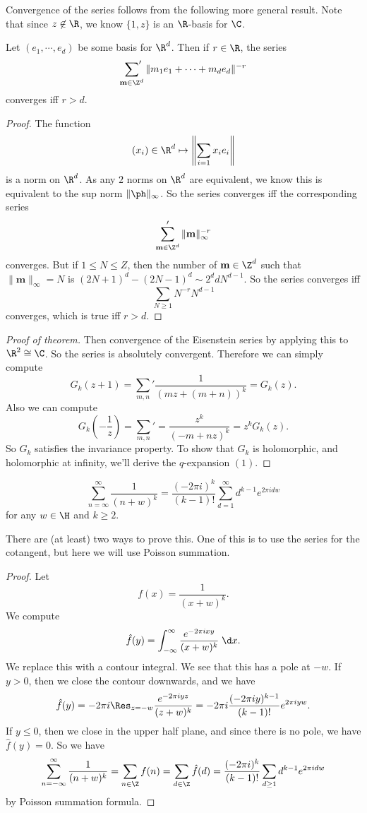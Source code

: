 \documentclass[a4paper]{article}
\begin{document}
Convergence of the series follows from the following more general result. Note that since $z \not \in \R$, we know $\{1, z\}$ is an $\R$-basis for $\C$.
\begin{prop}
  Let $(e_1, \cdots, e_d)$ be some basis for $\R^d$. Then if $r \in \R$, the series
  \[
    \sideset{}{'}\sum_{\mathbf{m} \in \Z^d} \|m_1 e_1 + \cdots + m_d e_d\|^{-r}
  \]
  converges iff $r > d$.
\end{prop}

\begin{proof}
  The function
  \[
    (x_i) \in \R^d \mapsto \left\|\sum_{i = 1} x_i e_i \right\|
  \]
  is a norm on $\R^d$. As any $2$ norms on $\R^d$ are equivalent, we know this is equivalent to the sup norm $\|\ph\|_\infty$. So the series converges iff the corresponding series
  \[
    \sum_{\mathbf{m} \in \Z^d}' \|\mathbf{m}\|_\infty^{-r}
  \]
  converges. But if $1 \leq N \leq Z$, then the number of $\mathbf{m} \in \Z^d$ such that $\|\mathbf{m}\|_\infty = N$ is $(2N + 1)^d - (2N - 1)^d \sim 2^d d N^{d - 1}$. So the series converges iff
  \[
    \sum_{N \geq 1} N^{-r} N^{d - 1}
  \]
  converges, which is true iff $r > d$.
\end{proof}

\begin{proof}[Proof of theorem]
  Then convergence of the Eisenstein series by applying this to $\R^2 \cong \C$. So the series is absolutely convergent. Therefore we can simply compute
  \[
    G_k(z + 1) = \sum_{m, n}' \frac{1}{(mz + (m + n))^k} = G_k(z).
  \]
  Also we can compute
  \[
    G_k\left(-\frac{1}{z}\right) = \sum_{m, n}' = \frac{z^k}{(-m + nz)^k} = z^k G_k(z).
  \]
  So $G_k$ satisfies the invariance property. To show that $G_k$ is holomorphic, and holomorphic at infinity, we'll derive the $q$-expansion $(1)$.
\end{proof}

\begin{lemma}
  \[
    \sum_{n = \infty}^\infty \frac{1}{(n + w)^k} = \frac{(-2\pi i)^k}{(k - 1)!} \sum_{d = 1}^\infty d^{k - 1} e^{2\pi i d w}
  \]
  for any $w \in \H$ and $k \geq 2$.
\end{lemma}
There are (at least) two ways to prove this. One of this is to use the series for the cotangent, but here we will use Poisson summation.

\begin{proof}
  Let
  \[
    f(x) = \frac{1}{(x + w)^k}.
  \]
  We compute
  \[
    \hat{f}(y) = \int_{-\infty}^\infty \frac{e^{-2\pi i x y}}{(x + w)^k}\;\d x.
  \]
  We replace this with a contour integral. We see that this has a pole at $-w$. If $y > 0$, then we close the contour downwards, and we have
  \[
    \hat{f}(y) = -2\pi i \Res_{z = -w} \frac{e^{-2\pi i y z}}{(z + w)^k} = -2\pi i \frac{(-2\pi i y)^{k - 1}}{(k - 1)!} e^{2\pi i yw}.
  \]
  If $y \leq 0$, then we close in the upper half plane, and since there is no pole, we have $\hat{f}(y) = 0$. So we have
  \[
    \sum_{n = -\infty}^\infty \frac{1}{(n + w)^k} = \sum_{n \in \Z} f(n) = \sum_{d \in \Z} \hat{f}(d) = \frac{(-2\pi i)^k}{(k - 1)!} \sum_{d \geq 1} d^{k - 1} e^{2\pi i d w}
  \]
  by Poisson summation formula.
\end{proof}
\end{document}

